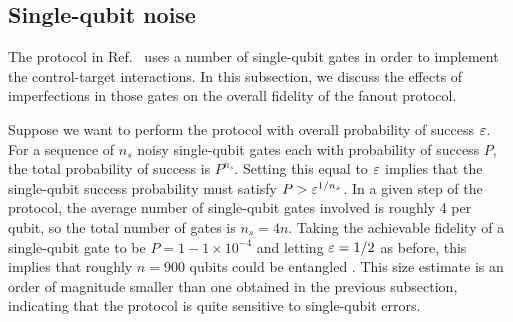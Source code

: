 \subsection*{Single-qubit noise}
The protocol in Ref.~\cite{Eldredge2017} uses a number of single-qubit gates in order to implement the control-target interactions.
In this subsection, we discuss the effects of imperfections in those gates on the overall fidelity of the fanout protocol.

Suppose we want to perform the protocol with overall probability of success $\varepsilon$.
For a sequence of $n_s$ noisy single-qubit gates each with probability of success $P$, the total probability of success is $P^{n_s}$.
Setting this equal to $\varepsilon$ implies that the single-qubit success probability must satisfy $P > \varepsilon^{1/n_s}$.
In a given step of the protocol, the average number of single-qubit gates involved is roughly 4 per qubit, so the total number of gates is $n_s = 4n$.
Taking the achievable fidelity of a single-qubit gate to be $P = 1- 1\times10^{-4}$ and letting $\varepsilon = 1/2$ as before, this implies that roughly $n = 900$ qubits could be entangled \cite{Eldredge2017}.
This size estimate is an order of magnitude smaller than one obtained in the previous subsection, indicating that the protocol is quite sensitive to single-qubit errors.
